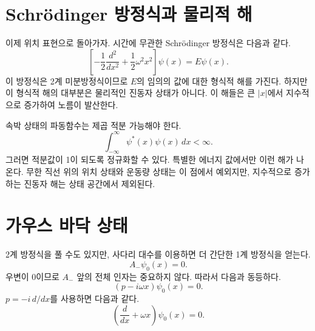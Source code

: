 \begin{classroomqa}
\end{classroomqa}

\section{Schr\"odinger 방정식과 물리적 해}

이제 위치 표현으로 돌아가자. 시간에 무관한 Schr\"odinger 방정식은 다음과 같다.
\begin{equation}
\left[
-\frac12\frac{d^{2}}{dx^{2}}
+\frac12\omega^{2}x^{2}
\right]\psi(x)=E\psi(x).
\end{equation}
이 방정식은 2계 미분방정식이므로 \(E\)의 임의의 값에 대한 형식적 해를 가진다. 하지만 이 형식적 해의 대부분은 물리적인 진동자 상태가 아니다. 이 해들은 큰 \(\lvert x\rvert\)에서 지수적으로 증가하여 노름이 발산한다.

속박 상태의 파동함수는 제곱 적분 가능해야 한다.
\begin{equation}
\int_{-\infty}^{\infty}\psi^{*}(x)\psi(x)\,dx<\infty.
\end{equation}
그러면 적분값이 1이 되도록 정규화할 수 있다. 특별한 에너지 값에서만 이런 해가 나온다. 무한 직선 위의 위치 상태와 운동량 상태는 이 점에서 예외지만, 지수적으로 증가하는 진동자 해는 상태 공간에서 제외된다.

\section{가우스 바닥 상태}

2계 방정식을 풀 수도 있지만, 사다리 대수를 이용하면 더 간단한 1계 방정식을 얻는다.
\begin{equation}
A_{-}\psi_{0}(x)=0.
\end{equation}
우변이 0이므로 \(A_{-}\) 앞의 전체 인자는 중요하지 않다. 따라서 다음과 동등하다.
\begin{equation}
(p-i\omega x)\psi_{0}(x)=0.
\end{equation}
\(p=-i\,d/dx\)를 사용하면 다음과 같다.
\begin{equation}
\left(\frac{d}{dx}+\omega x\right)\psi_{0}(x)=0.
\end{equation}

\begin{classroomqa}
\end{classroomqa}

